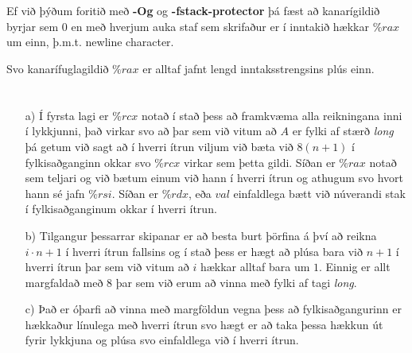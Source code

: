 \documentclass{article}
\begin{document}
	\section{}

	Ef við þýðum foritið með \textbf{-Og} og \textbf{-fstack-protector} þá 
	fæst að kanarígildið byrjar sem $0$ en með hverjum auka staf sem 
	skrifaður er í inntakið hækkar $\%rax$ um einn, þ.m.t. newline character.

	Svo kanarífuglagildið $\%rax$ er alltaf jafnt lengd inntaksstrengsins 
	plús einn.

	\section{}
	\begin{itemize}
		\item[a)] Í fyrsta lagi er $\%rcx$ notað í stað þess að framkvæma 
			alla reikningana inni í lykkjunni, það virkar svo að þar sem 
			við vitum að $A$ er fylki af stærð \textit{long} þá getum við 
			sagt að í hverri ítrun viljum við bæta við $8(n+1)$ í 
			fylkisaðganginn okkar svo $\%rcx$ virkar sem þetta gildi. 
			Síðan er $\%rax$ notað sem teljari og við bætum einum við hann 
			í hverri ítrun og athugum svo hvort hann sé jafn $\%rsi$. 
			Síðan er $\%rdx$, eða $val$ einfaldlega bætt við núverandi 
			stak í fylkisaðganginum okkar í hverri ítrun.
		\item[b)] Tilgangur þessarrar skipanar er að besta burt þörfina á 
			því að reikna $i\cdot n + 1$ í hverri ítrun fallsins og í 
			stað þess er hægt að plúsa bara við $n+1$ í hverri ítrun þar 
			sem við vitum að $i$ hækkar alltaf bara um $1$. Einnig er allt 
			margfaldað með $8$ þar sem við erum að vinna með fylki af tagi 
			\textit{long}.
		\item[c)] Það er óþarfi að vinna með margföldun vegna þess að 
			fylkisaðgangurinn er hækkaður línulega með hverri ítrun svo 
			hægt er að taka þessa hækkun út fyrir lykkjuna og plúsa svo 
			einfaldlega við í hverri ítrun.
	\end{itemize}
\end{document}
